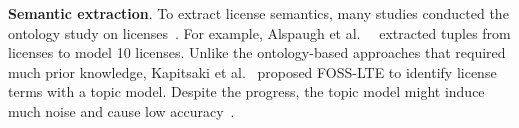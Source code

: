 \noindent \textbf{Semantic extraction}. 
To extract license semantics, many studies conducted the ontology study on licenses~\cite{IREC`09-Alspaugh-Intellectual,AIS`10-Alspaugh-Challenge,Qualipso`10-gordon-prototype,ICAIL`11-Gordon-Analyzing,ICAIL`13-Gordon-Introducing,COMMA`14-Gordon-Demonstration}. For example, Alspaugh et al.~\cite{IREC`09-Alspaugh-Intellectual}~\cite{AIS`10-Alspaugh-Challenge} extracted tuples from licenses to model 10 licenses. 
Unlike the ontology-based approaches that required much prior knowledge, Kapitsaki et al.~\cite{APSEC`17-Kapitsaki-termsIdentifying} proposed FOSS-LTE to identify license terms with a topic model. %
Despite the progress, the topic model might induce much noise and cause low accuracy~\cite{xu2021lidetector}. 


